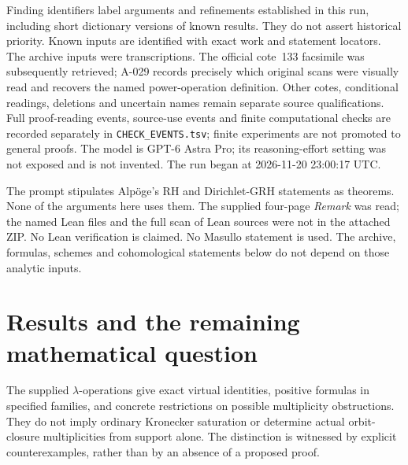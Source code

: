 \documentclass[11pt]{article}
\begin{document}
Finding identifiers label arguments and refinements established in this
run, including short dictionary versions of known results. They do not
assert historical priority. Known inputs are identified with exact work
and statement locators. The archive inputs were transcriptions. The official cote~133 facsimile
was subsequently retrieved; A-029 records precisely which original
scans were visually read and recovers the named power-operation definition.
Other cotes, conditional readings, deletions and uncertain names remain
separate source qualifications. Full proof-reading events, source-use events
and finite computational checks are recorded separately in
\texttt{CHECK\_EVENTS.tsv}; finite experiments are not promoted to general
proofs. The model is GPT-6 Astra Pro; its reasoning-effort setting was not
exposed and is not invented. The run began at 2026-11-20 23:00:17 UTC.

The prompt stipulates Alp\"oge's RH and Dirichlet-GRH statements as
theorems. None of the arguments here uses them. The supplied four-page
\emph{Remark} was read; the named Lean files and the full scan of Lean
sources were not in the attached ZIP. No Lean verification is claimed.
No Masullo statement is used. The archive, formulas, schemes and
cohomological statements below do not depend on those analytic inputs.
\clearpage
\tableofcontents
\clearpage
\section*{Results and the remaining mathematical question}

The supplied \(\lambda\)-operations give exact virtual identities,
positive formulas in specified families, and concrete restrictions on
possible multiplicity obstructions. They do not imply ordinary
Kronecker saturation or determine actual orbit-closure multiplicities
from support alone. The distinction is witnessed by explicit
counterexamples, rather than by an absence of a proposed proof.
\end{document}
